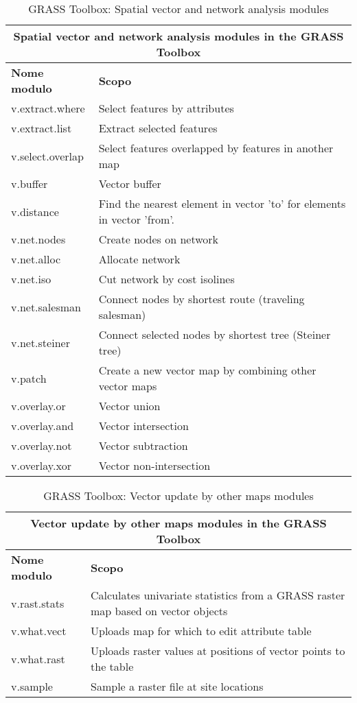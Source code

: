 \begin{table}[ht]
\centering
\caption{GRASS Toolbox: Spatial vector and network analysis modules}\medskip
 \begin{tabular}{|p{4cm}|p{12cm}|}
  \hline \multicolumn{2}{|c|}{\textbf{Spatial vector and network analysis modules in the GRASS
  Toolbox}} \\
  \hline \textbf{Nome modulo} & \textbf{Scopo} \\
  \hline v.extract.where & Select features by attributes \\
  \hline v.extract.list & Extract selected features \\
  \hline v.select.overlap & Select features overlapped by features in another
  map\\
  \hline v.buffer & Vector buffer \\
  \hline v.distance & Find the nearest element in vector 'to' for elements in
  vector 'from'. \\
  \hline v.net.nodes & Create nodes on network \\
  \hline v.net.alloc & Allocate network\\
  \hline v.net.iso & Cut network by cost isolines \\
  \hline v.net.salesman & Connect nodes by shortest route (traveling
  salesman) \\
  \hline v.net.steiner & Connect selected nodes by shortest tree (Steiner
  tree) \\
  \hline v.patch & Create a new vector map by combining other vector maps \\
  \hline v.overlay.or & Vector union \\
  \hline v.overlay.and & Vector intersection \\
  \hline v.overlay.not & Vector subtraction \\
  \hline v.overlay.xor & Vector non-intersection \\
\hline
\end{tabular}
\end{table}

\begin{table}[ht]
\centering
\caption{GRASS Toolbox: Vector update by other maps modules}\medskip
 \begin{tabular}{|p{4cm}|p{12cm}|}
  \hline \multicolumn{2}{|c|}{\textbf{Vector update by other maps modules in the GRASS
  Toolbox}} \\
  \hline \textbf{Nome modulo} & \textbf{Scopo} \\
  \hline v.rast.stats & Calculates univariate statistics from a GRASS raster
  map based on vector objects\\
  \hline v.what.vect & Uploads map for which to edit attribute table \\
  \hline v.what.rast & Uploads raster values at positions of vector points to
  the table \\
  \hline v.sample & Sample a raster file at site locations \\
\hline
\end{tabular}
\end{table}

